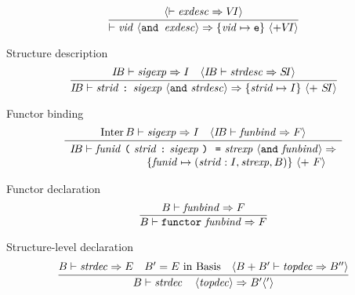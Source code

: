 \begin{inference-rule}{}
\begin{equation}\label{rule:dynamic-modules:exception-description}
\vcenter{\infer{ \ts\vid\ \optional{\boxml{and\ }\exndesc}\ra\{\vid\mapsto\ise\}\ \optional{+ \VI} }
  { \optional{\ts\exndesc\ra\VI} }}
\end{equation}
\end{inference-rule}

\begin{inference-rule}{Structure description}
\begin{equation}\label{rule:dynamic-modules:structure-description}
\vcenter{\infer{ \IB\ts\strdescription\ra\{\strid\mapsto\I\}\ \optional{ +\ \SI} }
  { \IB\ts\sigexp\ra\I
    & \optional{\IB\ts\strdesc\ra\SI} }}
\end{equation}
\end{inference-rule}

\begin{inference-rule}{Functor binding}
\begin{equation}\label{rule:dynamic-modules:functor-binding}
\vcenter{\infer{\begin{array}{c}
      \IB\ts\barefunstrbinder\ \optfunbinda\ra\\
      \qquad\qquad \qquad
      \{\funid\mapsto(\strid:\I,\strexp,\B)\}
      \ \optional{ +\ \F}
  \end{array}}
  {\Inter\B\ts\sigexp\ra\I
   & \optional{\IB\ts\funbind\ra\F}}}
\end{equation}
\end{inference-rule}

\begin{inference-rule}{Functor declaration}
\begin{equation}\label{rule:dynamic-modules:functor-declaration}
\vcenter{\infer{ \B\ts\singfundec\ra\F }
  { \B\ts\funbind\ra\F }}
\end{equation}
\end{inference-rule}


\begin{inference-rule}{Structure-level declaration}
\begin{equation}\label{rule:dynamic-modules:structure-level-declaration}
\vcenter{\infer{\B\ts\strdecintopdec\ra\B'\optional{'}}
  {\B\ts\strdec\ra\E
    &\B' =\E\ \In\ \Basis
    &\optional{ \B+\B'\ts\topdec\ra\B''} }}
\end{equation}
\end{inference-rule}

